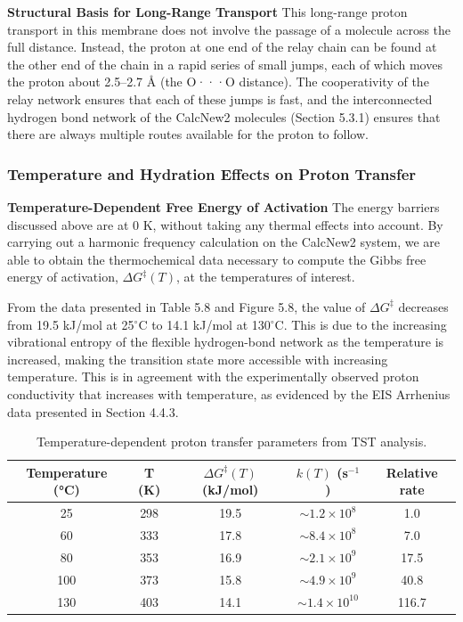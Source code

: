 \documentclass[12pt,a4paper]{report}
\begin{document}
\textbf{Structural Basis for Long-Range Transport}
This long-range proton transport in this membrane does not involve the passage of a molecule across the full distance. Instead, the proton at one end of the relay chain can be found at the other end of the chain in a rapid series of small jumps, each of which moves the proton about 2.5–2.7 Å (the O···O distance). The cooperativity of the relay network ensures that each of these jumps is fast, and the interconnected hydrogen bond network of the CalcNew2 molecules (Section 5.3.1) ensures that there are always multiple routes available for the proton to follow.\cite{61,62,63,64}

\subsubsection{Temperature and Hydration Effects on Proton Transfer}

\textbf{Temperature-Dependent Free Energy of Activation}
The energy barriers discussed above are at 0 K, without taking any thermal effects into account. By carrying out a harmonic frequency calculation on the CalcNew2 system, we are able to obtain the thermochemical data necessary to compute the Gibbs free energy of activation, \(\Delta G^{\ddagger}(T)\), at the temperatures of interest.\cite{92, 93}

From the data presented in Table 5.8 and Figure 5.8, the value of \(\Delta G^{\ddagger}\) decreases from 19.5 kJ/mol at 25\(^\circ\)C to 14.1 kJ/mol at 130\(^\circ\)C. This is due to the increasing vibrational entropy of the flexible hydrogen-bond network as the temperature is increased, making the transition state more accessible with increasing temperature. This is in agreement with the experimentally observed proton conductivity that increases with temperature, as evidenced by the EIS Arrhenius data presented in Section 4.4.3.\cite{65, 66, 72, 73}

\begin{table}[h!]
\centering
\caption{Temperature-dependent proton transfer parameters from TST analysis.}
\label{tab:temperature-dependence}
\begin{tabular}{c c c c c}
\toprule
Temperature (°C) & T (K) & \(\Delta G^{\ddagger}(T)\) (kJ/mol) & \(k(T)\) (s\(^{-1}\)) & Relative rate \\
\midrule
25  & 298 & 19.5 & \(\sim 1.2 \times 10^{8}\)  & 1.0   \\
60  & 333 & 17.8 & \(\sim 8.4 \times 10^{8}\)  & 7.0   \\
80  & 353 & 16.9 & \(\sim 2.1 \times 10^{9}\)  & 17.5  \\
100 & 373 & 15.8 & \(\sim 4.9 \times 10^{9}\)  & 40.8  \\
130 & 403 & 14.1 & \(\sim 1.4 \times 10^{10}\) & 116.7 \\
\bottomrule
\end{tabular}
\end{table}
\end{document}
